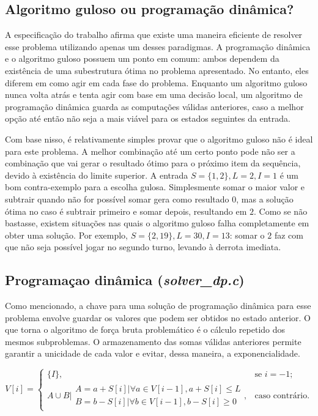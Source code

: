\documentclass[10pt,a4paper]{article}
\numberwithin{equation}{section}
\begin{document}
\subsection{Algoritmo guloso ou programação dinâmica?}

A especificação do trabalho afirma que existe uma maneira eficiente de resolver esse problema utilizando apenas um desses paradigmas. A programação dinâmica e o algoritmo guloso possuem um ponto em comum: ambos dependem da existência de uma subestrutura ótima no problema apresentado. No entanto, eles diferem em como agir em cada fase do problema. Enquanto um algoritmo guloso nunca volta atrás e tenta agir com base em uma decisão local, um algoritmo de programação dinâmica guarda as computações válidas anteriores, caso a melhor opção até então não seja a mais viável para os estados seguintes da entrada.

Com base nisso, é relativamente simples provar que o algoritmo guloso não é ideal para este problema. A melhor combinação até um certo ponto pode não ser a combinação que vai gerar o resultado ótimo para o próximo item da sequência, devido à existência do limite superior. A entrada $S = \{1,2\}, L = 2, I = 1$ é um bom contra-exemplo para a escolha gulosa. Simplesmente somar o maior valor e subtrair quando não for possível somar gera como resultado $0$, mas a solução ótima no caso é subtrair primeiro e somar depois, resultando em $2$. Como se não bastasse, existem situações nas quais o algoritmo guloso falha completamente em obter uma solução. Por exemplo, $S = \{2, 19\}, L = 30, I = 13$: somar o $2$ faz com que não seja possível jogar no segundo turno, levando à derrota imediata.

\subsection{Programaçao dinâmica (\emph{solver\_dp.c})}

Como mencionado, a chave para uma solução de programação dinâmica para esse problema envolve guardar os valores que podem ser obtidos no estado anterior. O que torna o algoritmo de força bruta problemático é o cálculo repetido dos mesmos subproblemas. O armazenamento das somas válidas anteriores permite garantir a unicidade de cada valor e evitar, dessa maneira, a exponencialidade.

\begin{equation}
    V[i]=\begin{cases}
        \{I\}, & \text{se $i = -1$;}\\
        A \cup B \vert \begin{array}{ll}
        	A = a + S[i] \vert \forall a \in V[i-1], a + S[i] \le L \\
        	B = b - S[i] \vert \forall b \in V[i-1], b - S[i] \ge 0
        \end{array}, & \text{caso contrário.}
    \end{cases}
\end{equation}
\end{document}

